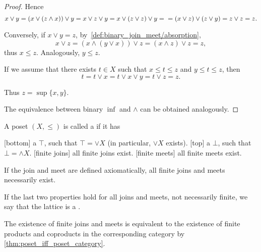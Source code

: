 \begin{proof}
  Hence
  \begin{equation*}
    x \lor y = (x \lor (z \land x)) \lor y = x \lor z \lor y = x \lor (z \lor z) \lor y = \\ = (x \lor z) \lor (z \lor y) = z \lor z = z.
  \end{equation*}

  Conversely, if \( x \lor y = z \), by~\ref{def:binary_join_meet/absorption},
  \begin{equation*}
    x \lor z = (x \land (y \lor x)) \lor z = (x \land z) \lor z = z,
  \end{equation*}
  thus \( x \leq z \). Analogously, \( y \leq z \).

  If we assume that there exists \( t \in X \) such that \( x \leq t \leq z \) and \( y \leq t \leq z \), then
  \begin{equation*}
    t = t \lor x = t \lor x \lor y = t \lor z = z.
  \end{equation*}

  Thus \( z = \sup \{ x, y \} \).

  The equivalence between binary \( \inf \) and \( \land \) can be obtained analogously.
\end{proof}

\begin{definition}\label{def:lattice}
  A poset \( (X, \leq) \) is called a  if it has
  \begin{description}
    [bottom] a  \( \top \), such that \( \top = \lor X \) (in particular, \( \lor X \) exists).
    [top] a  \( \bot \), such that \( \bot = \land X \).
    [finite joins] all finite joins exist.
    [finite meets] all finite meets exist.
  \end{description}

  If the join and meet are defined axiomatically, all finite joins and meets necessarily exist.

  If the last two properties hold for all joins and meets, not necessarily finite, we say that the lattice is a .
\end{definition}

\begin{remark}\label{def:lattice_categorical_product}
  The existence of finite joins and meets is equivalent to the existence of finite products and coproducts in the corresponding category by \cref{thm:poset_iff_poset_category}.
\end{remark}

